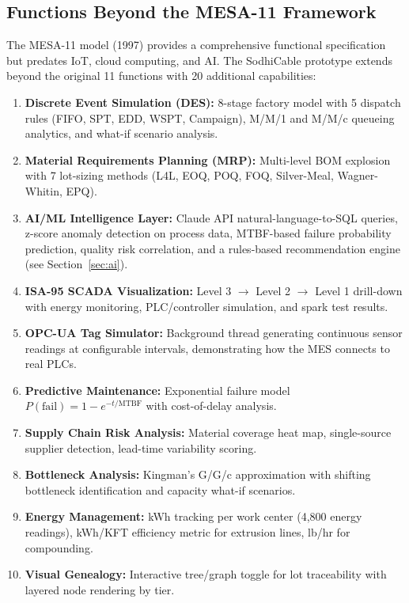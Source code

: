 \documentclass[11pt]{article}
\begin{document}
\subsection{Functions Beyond the MESA-11 Framework}

The MESA-11 model (1997) provides a comprehensive functional specification but predates IoT, cloud computing, and AI. The SodhiCable prototype extends beyond the original 11 functions with 20 additional capabilities:

\begin{enumerate}[leftmargin=2em, itemsep=1pt]
\item \textbf{Discrete Event Simulation (DES):} 8-stage factory model with 5 dispatch rules (FIFO, SPT, EDD, WSPT, Campaign), M/M/1 and M/M/c queueing analytics, and what-if scenario analysis.
\item \textbf{Material Requirements Planning (MRP):} Multi-level BOM explosion with 7 lot-sizing methods (L4L, EOQ, POQ, FOQ, Silver-Meal, Wagner-Whitin, EPQ).
\item \textbf{AI/ML Intelligence Layer:} Claude API natural-language-to-SQL queries, z-score anomaly detection on process data, MTBF-based failure probability prediction, quality risk correlation, and a rules-based recommendation engine (see Section~\ref{sec:ai}).
\item \textbf{ISA-95 SCADA Visualization:} Level 3 $\to$ Level 2 $\to$ Level 1 drill-down with energy monitoring, PLC/controller simulation, and spark test results.
\item \textbf{OPC-UA Tag Simulator:} Background thread generating continuous sensor readings at configurable intervals, demonstrating how the MES connects to real PLCs.
\item \textbf{Predictive Maintenance:} Exponential failure model $P(\text{fail}) = 1 - e^{-t/\text{MTBF}}$ with cost-of-delay analysis.
\item \textbf{Supply Chain Risk Analysis:} Material coverage heat map, single-source supplier detection, lead-time variability scoring.
\item \textbf{Bottleneck Analysis:} Kingman's G/G/c approximation with shifting bottleneck identification and capacity what-if scenarios.
\item \textbf{Energy Management:} kWh tracking per work center (4{,}800 energy readings), kWh/KFT efficiency metric for extrusion lines, lb/hr for compounding.
\item \textbf{Visual Genealogy:} Interactive tree/graph toggle for lot traceability with layered node rendering by tier.

\end{enumerate}
\end{document}
